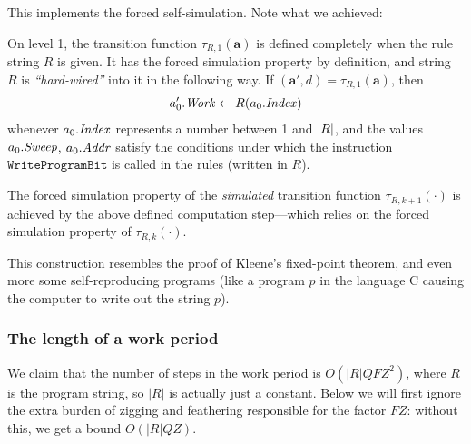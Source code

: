 \documentclass[11pt]{memoir}
\theoremstyle{definition} %
\renewcommand{\vek}[1]{\mathbf{#1}}
\newcommand{\fld}[1]{\ensuremath{\textit{#1\/}}}
\newcommand{\rul}[1]{\ensuremath{\texttt{#1}}}
\newcommand{\va}{\vek{a}} %
\newcommand{\F}{F}
\newcommand{\Q}{Q} %
\newcommand{\Z}{Z} %
\newcommand{\Interpr}{\mathrm{Interpr}} %
\newcommand{\Addr}{\fld{Addr}}
\newcommand{\Index}{\fld{Index}}
\newcommand{\Sweep}{\fld{Sweep}} %
\newcommand{\Work}{\fld{Work}} %
\newcommand{\WriteProgramBit}{\rul{WriteProgramBit}}
\begin{document}
This implements the forced self-simulation.
Note what we achieved:

\begin{itemize}
  \begin{sloppypar}
\item On level 1, the transition function \( \tau_{R,1}(\va) \) is defined completely
when the rule string \( R \) is given.
It has the forced simulation property by definition, and
string \( R \) is \emph{``hard-wired''} into it in the following way.
If \( (\va',d)=\tau_{R,1}(\va) \), then
\begin{align*}
  a'_{0}.\Work\gets R(a_{0}.\Index)
\end{align*}
whenever \( a_{0}.\Index \) represents a number between 1 and \( \lvert R \rvert \),
and the values \( a_{0}.\Sweep \), \( a_{0}.\Addr \) satisfy the conditions
under which the instruction \( \WriteProgramBit \) is 
called in the rules (written in \( R \)).
      \end{sloppypar}

      \begin{sloppypar}
\item The forced simulation property of the \emph{simulated}
transition function \( \tau_{R,k+1}(\cdot) \) is 
achieved by the above defined computation 
step---which relies on the forced simulation property of \( \tau_{R,k}(\cdot) \).
  \end{sloppypar}
\end{itemize}

\begin{remark}
  This construction resembles the proof of Kleene's fixed-point theorem, and even more
  some self-reproducing programs (like a program \( p \) in the language C causing the computer
  to write out the string \( p \)).
\end{remark}

\subsubsection{The length of a work period}\label{sec:length-work-period}

We claim that the number of steps in the work period is \( O(|R|\Q\F\Z^{2}) \),
where \( R \) is the program string, so \( |R| \) is actually just a constant.
Below we will first ignore the extra burden of zigging and feathering responsible for
the factor \( \F\Z \): without this, we get a bound \( O(|R|\Q\Z) \).
\end{document}
